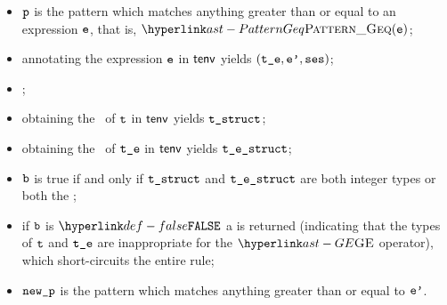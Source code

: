 \ProseParagraph
\AllApply
\begin{itemize}
\item $\vp$ is the pattern which matches anything greater than or equal to an expression $\ve$,
      that is, $\PatternGeq(\ve)$;
\item annotating the expression $\ve$ in $\tenv$ yields $(\vte, \vep, \vses)$\ProseOrTypeError;
\item \Prosechecksymbolicallyevaluable{$\vses$};
\item obtaining the \underlyingtype\ of $\vt$ in $\tenv$ yields $\vtstruct$\ProseOrTypeError;
\item obtaining the \underlyingtype\ of $\vte$ in $\tenv$ yields $\testruct$\ProseOrTypeError;
\item $\vb$ is true if and only if $\vtstruct$ and $\testruct$ are both integer types or both the \realtypeterm{};
\item if $\vb$ is $\False$ a \typingerrorterm{} is returned (indicating that the types of $\vt$ and $\vte$
      are inappropriate for the $\GE$ operator),
      which short-circuits the entire rule;
\item $\newp$ is the pattern which matches anything greater than or equal to $\vep$.
\end{itemize}
\FormallyParagraph
\begin{mathpar}
\end{mathpar}

